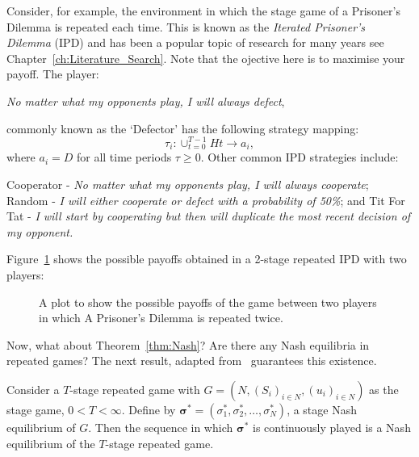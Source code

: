 Consider, for example, the environment in which the stage game of a Prisoner's
Dilemma is repeated each time. This is known as the \emph{Iterated Prisoner's
Dilemma} (IPD) and has been a popular topic of research for many years see
Chapter~\ref{ch:Literature_Search}. Note that the ojective here is to maximise
your payoff. The player: 
\begin{center}
    \textit{No matter what my opponents play, I will always defect},
\end{center}
commonly known as the `Defector' has the following strategy mapping:
\[
    \tau_{i} : \cup_{t = 0}^{T-1}{H{t}} \to a_{i},
\]
where \(a_{i}=D\) for all time periods \(\tau \ge 0\). Other common IPD
strategies include: 
\begin{center}
    Cooperator - \textit{No matter what my opponents play, I will always
    cooperate};
    Random - \textit{I will either cooperate or defect with a probability of
    50\%}; and
    \newline Tit For Tat - \textit{I will start by cooperating but then will duplicate the most recent decision of my opponent.}
\end{center}

Figure~\ref{fig:2-stage_payoff_plot} shows the possible payoffs obtained in a 2-stage repeated IPD with
two players:

\begin{figure}\label{fig:2-stage_payoff_plot}
    \caption{A plot to show the possible payoffs of the game between two players in which A Prisoner's Dilemma is repeated twice.}
\end{figure}


Now, what about Theorem~\ref{thm:Nash}? Are there any Nash equilibria in
repeated games? The next result, adapted from~\cite{Knight2019a} guarantees 
this existence.
\begin{theorem}
    Consider a \(T\)-stage repeated game with \(G=(N, (S_{i})_{i \in N},
    (u_{i})_{i \in N})\) as the stage game, \(0 < T < \infty\). Define by
    \(\bm\sigma^{*} =(\sigma_{1}^{*}, \sigma_{2}^{*}, \ldots, \sigma_{N}^{*})\),
    a stage Nash equilibrium of \(G\). Then the sequence in which
    \(\bm\sigma^{*}\) is continuously played is a Nash equilibrium of the
    \(T\)-stage repeated game.
\end{theorem} 

